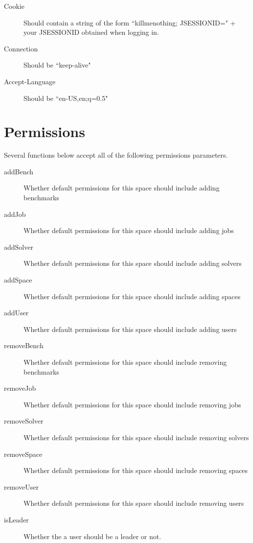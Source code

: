 \begin{description}
\item [Cookie]  Should contain a string of the form ``killmenothing; JSESSIONID=" + your JSESSIONID obtained when logging in.
\item [Connection]  Should be ``keep-alive"
\item [Accept-Language]  Should be ``en-US,en;q=0.5"
\end{description}

\section{Permissions}

Several functions below accept all of the following permissions parameters.

\begin{description}
\item [addBench]  Whether default permissions for this space should include adding benchmarks
\item [addJob]  Whether default permissions for this space should include adding jobs
\item [addSolver]  Whether default permissions for this space should include adding solvers
\item [addSpace]  Whether default permissions for this space should include adding spaces
\item [addUser]  Whether default permissions for this space should include adding users
\item [removeBench]  Whether default permissions for this space should include removing benchmarks
\item [removeJob]  Whether default permissions for this space should include removing jobs
\item [removeSolver]  Whether default permissions for this space should include removing solvers
\item [removeSpace]  Whether default permissions for this space should include removing spaces
\item [removeUser]  Whether default permissions for this space should include removing users
\item [isLeader]  Whether the a user should be a leader or not.
\end{description}
